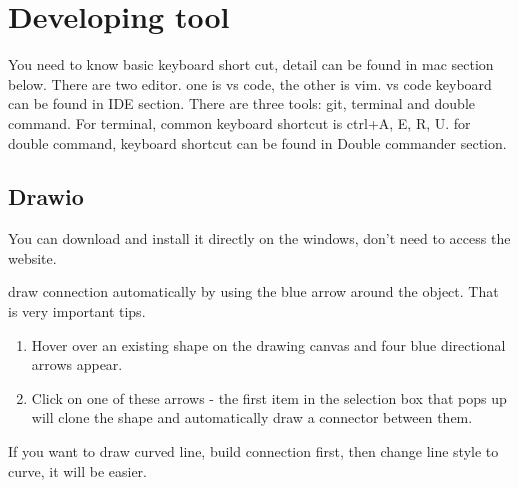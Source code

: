 \documentclass[paper=8.5in:11in, twoside, 12pt, pagesize=pdftex]{book}
\begin{document}
%		



\chapter{Developing tool}

You need to know basic keyboard short cut,  detail can be found in mac section below.  There are two editor.  one is vs code, the other is vim.  vs code keyboard can be found in IDE section.  There are three tools: git, terminal and double command.  For terminal, common keyboard shortcut is ctrl+A, E, R, U. for double command, keyboard shortcut can be found in Double commander section. 


\section{Drawio}
You can download and install it directly on the windows, don't need to access the website. 

draw connection automatically by using the blue arrow around the object. That is very important tips.  

\begin{enumerate}
	\item Hover over an existing shape on the drawing canvas and four blue directional arrows appear.
	
	\item Click on one of these arrows - the first item in the selection box that pops up will clone the shape and automatically draw a connector between them.
\end{enumerate}

If you want to draw curved line, build connection first, then change line style to curve, it will be easier. 
\end{document}
